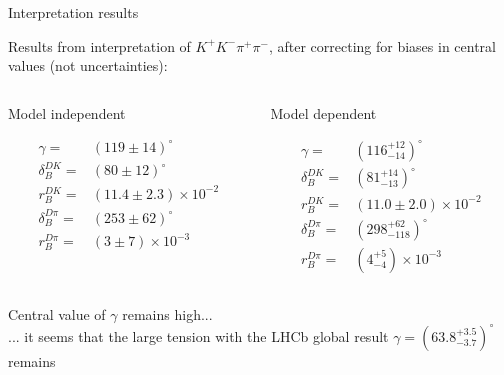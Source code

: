 \documentclass[xcolor={dvipsnames}]{beamer}
\begin{document}
\begin{frame}{Interpretation results}
  \begin{center}
    {\large Results from interpretation of $K^+K^-\pi^+\pi^-$, after correcting for biases in central values (not uncertainties):}
  \end{center}
  \vspace{-0.5cm}
  \begin{columns}
    \begin{column}{0.5\textwidth}
      \begin{center}
        Model independent
      \end{center}
      \begin{align*}
        \gamma =& (119 \pm 14)^\circ \\
        \delta_B^{DK} =& (80 \pm 12)^\circ \\
        r_B^{DK} =& (11.4 \pm 2.3)\times10^{-2} \\
        \delta_B^{D\pi} =& (253 \pm 62)^\circ \\
        r_B^{D\pi} =& (3 \pm 7)\times10^{-3}
      \end{align*}
    \end{column}
    \begin{column}{0.5\textwidth}
      \begin{center}
        Model dependent
      \end{center}
      \begin{align*}
        \gamma =& (116^{+12}_{-14})^\circ \\
        \delta_B^{DK} =& (81^{+14}_{-13})^\circ \\
        r_B^{DK} =& (11.0 \pm 2.0)\times10^{-2} \\
        \delta_B^{D\pi} =& (298^{+62}_{-118})^\circ \\
        r_B^{D\pi} =& (4^{+5}_{-4})\times10^{-3}
      \end{align*}
    \end{column}
  \end{columns}
  \vspace{0.2cm}
  \begin{center}
    Central value of $\gamma$ remains high...\\
    ... it seems that the large tension with the LHCb global result $\gamma = (63.8^{+3.5}_{-3.7})^\circ$ remains
  \end{center}
\end{frame}
\end{document}

